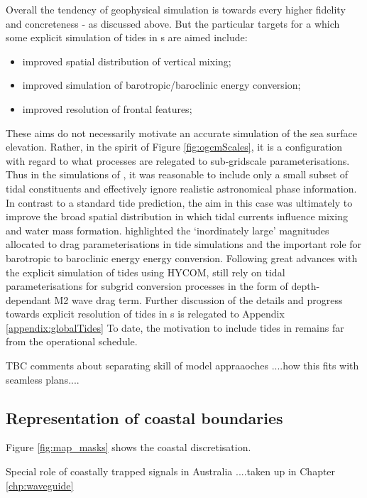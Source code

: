 Overall the tendency of geophysical simulation is towards every higher fidelity and concreteness - as discussed above. But the particular targets for a which some explicit simulation of tides in \OGCM{}s are aimed include:
\begin{itemize}
    \item improved spatial distribution of vertical mixing;
    \item improved simulation of barotropic/baroclinic energy conversion;
    \item improved resolution of frontal features;
\end{itemize}
These aims do not necessarily motivate an accurate simulation of the sea surface elevation.
Rather, in the spirit of Figure \ref{fig:ogcmScales}, it is a configuration with regard to what processes are relegated to sub-gridscale parameterisations.
Thus in the \OFAM{} simulations of \cite{Schiller:2004fv},  it was reasonable to include only a small subset of tidal constituents and effectively ignore realistic astronomical phase information.  In contrast to a standard tide prediction,  the aim in this case was ultimately to improve the broad spatial distribution in which tidal currents influence mixing and water mass formation.
\cite{Arbic:2004wz} highlighted the `inordinately large' magnitudes allocated to drag parameterisations in tide simulations and the important role for barotropic to baroclinic energy  energy conversion.  
Following great advances with the explicit simulation of tides using HYCOM,   \cite{10.1016/j.ocemod.2019.02.008} still rely on tidal parameterisations for subgrid conversion processes in the form of depth-dependant M2 wave drag term.
Further discussion of the details and progress towards explicit resolution of tides in \OCGM{}s is relegated to Appendix \ref{appendix:globalTides}
To date, the motivation to include tides in \BL{} remains far from the operational schedule.



TBC comments about separating skill of model appraaoches ....how this fits with seamless plans....



\subsection{Representation of coastal boundaries}

Figure \ref{fig:map_masks} shows the \BL{} coastal discretisation.



Special role of coastally trapped signals in Australia  
....taken up in Chapter \ref{chp:waveguide}




